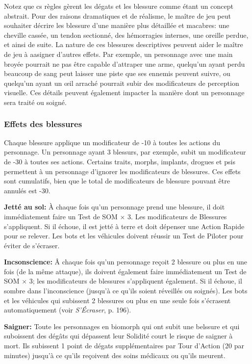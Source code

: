 Notez que cs règles gèrent les dégats et les blessure comme étant un concept abstrait. Pour des raisons dramatiques et de réalisme, le maître de jeu peut souhaiter décrire les blessure d'une manière plus détaillée et macabres: une cheville cassée, un tendon sectionné, des hémorragies internes, une oreille perdue, et ainsi de suite. La nature de ces blessures descriptives peuvent aider le maître de jeu à aasigner d'autres effets. Par exemple, un personnage avec une main broyée pourrait ne pas être capable d'attraper une arme, quelqu'un ayant perdu beaucoup de sang peut laisser une piste que ses ennemis peuvent suivre, ou quelqu'un ayant un œil arraché pourrait subir des modificateurs de perception visuelle. Ces détails peuvent également impacter la manière dont un personnage sera traité ou soigné. 

\subsubsection{Effets des blessures} 

Chaque blessure applique un modificateur de -10 à toutes les actions du personnage. Un personnage ayant 3 blessurs, par exemple, subit un modificateur de -30 à toutes ses actions. Certains traits, morphs, implants, drogues et psis permettent à un personnage d'ignorer les modificateurs de blessures. Ces effets sont cumulatifs, bien que le total de modificateurs de blessure pouvant être annulés est -30. 

\textbf{Jetté au sol:} À chaque fois qu'un personnage prend une blessure, il doit immédiatement faire un Test de SOM $\times$ 3. Les modificateurs de Blessures s'appliquent. Si il échoue, il est jetté à terre et doit dépenser une Action Rapide pour se relever. Les bots et les véhicules doivent réussir un Test de Piloter pour éviter de s'écraser. 

\textbf{Incsonscience:} Â chaque fois qu'un personnage reçoit 2 blessure ou plus en une fois (de la même attaque), ils doivent également faire immédiatement un Test de SOM $\times$ 3; les modificateurs de blessures s'appliquent également. Si il échoue, il sombre dans l'inconscience (jusqu'à ce qu'ils soient réveillés ou soignés). Les bots et les véhicules qui subissent 2 blessures ou plus en une seule fois s'écrasent automatiquement (voir \emph{S'Écraser}, p. 196). 

\textbf{Saigner:} Toute les personnages en biomorph qui ont subit une belssure et qui suboissent des dégâts qui dépassent leur Solidité court le risque de saigner à mort. Ils subissent 1 point de dégats supplémentaires par Tour d'Action (20 par minutes) jusqu'à ce qu'ils reçoivent des soins médicaux ou qu'ils meurent. 

